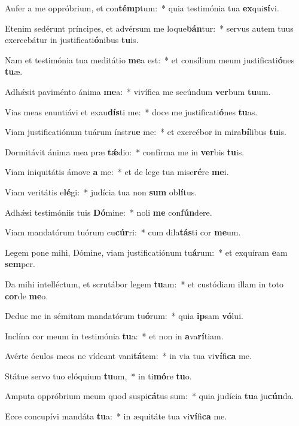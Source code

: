 \item Aufer a me oppróbrium, et con\textbf{témp}tum:~* quia testimónia tua \textbf{ex}qui\textbf{sí}vi.
\item Etenim sedérunt príncipes, et advérsum me loque\textbf{bán}tur:~* servus autem tuus exercebátur in justificati\textbf{ó}nibus \textbf{tu}is.
\item Nam et testimónia tua meditátio \textbf{me}a est:~* et consílium meum justificati\textbf{ó}nes \textbf{tu}æ.
\item Adhǽsit paviménto ánima \textbf{me}a:~* vivífica me secúndum \textbf{ver}bum \textbf{tu}um.
\item Vias meas enuntiávi et exau\textbf{dís}ti me:~* doce me justificati\textbf{ó}nes \textbf{tu}as.
\item Viam justificatiónum tuárum ínstru\textbf{e} me:~* et exercébor in mira\textbf{bí}libus \textbf{tu}is.
\item Dormitávit ánima mea præ \textbf{tǽ}dio:~* confírma me in \textbf{ver}bis \textbf{tu}is.
\item Viam iniquitátis ámove \textbf{a} me:~* et de lege tua mise\textbf{ré}re \textbf{me}i.
\item Viam veritátis e\textbf{lé}gi:~* judícia tua non \textbf{sum} ob\textbf{lí}tus.
\item Adhǽsi testimóniis tuis \textbf{Dó}mine:~* noli \textbf{me} con\textbf{fún}dere.
\item Viam mandatórum tuórum cu\textbf{cúr}ri:~* cum dila\textbf{tás}ti cor \textbf{me}um.
\item Legem pone mihi, Dómine, viam justificatiónum tu\textbf{á}rum:~* et exquíram \textbf{e}am \textbf{sem}per.
\item Da mihi intelléctum, et scrutábor legem \textbf{tu}am:~* et custódiam illam in toto \textbf{cor}de \textbf{me}o.
\item Deduc me in sémitam mandatórum tu\textbf{ó}rum:~* quia \textbf{ip}sam \textbf{vó}lui.
\item Inclína cor meum in testimónia \textbf{tu}a:~* et non in \textbf{a}va\textbf{rí}tiam.
\item Avérte óculos meos ne vídeant vani\textbf{tá}tem:~* in via tua vi\textbf{ví}fi\textbf{ca} me.
\item Státue servo tuo elóquium \textbf{tu}um,~* in ti\textbf{mó}re \textbf{tu}o.
\item Amputa oppróbrium meum quod suspi\textbf{cá}tus sum:~* quia judícia \textbf{tu}a ju\textbf{cún}da.
\item Ecce concupívi mandáta \textbf{tu}a:~* in æquitáte tua vi\textbf{ví}fi\textbf{ca} me.
